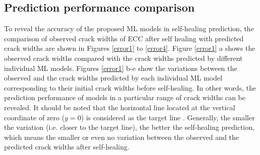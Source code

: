 \documentclass[11pt]{article}
\begin{document}
	
	\subsection{Prediction performance comparison}
To reveal the accuracy of the proposed ML models in self-healing prediction, the comparison of observed crack widths of ECC after self healing with predicted crack widths are shown in Figures \ref{error1} to \ref{error4}. Figure \ref{error1} a shows the observed crack widths compared with the crack widths predicted by different individual ML models. Figures \ref{error1} b-e show the variations between the observed and the crack widths predicted by each individual ML model corresponding to their initial crack widths before self-healing. In other words, the prediction performance of models in a particular range of crack widths can be revealed. It should be noted that the horizontal line located at the vertical coordinate of zero ($ y = 0$) is considered as the target line \cite{alshihri2009neural,yan2017evaluation}. Generally, the smaller the variation (i.e. closer to the target line), the better the self-healing prediction, which means the smaller or even no variation between the observed and the predicted crack widths after self-healing.
	
\end{document}
